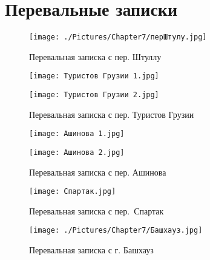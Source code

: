\graphicspath{ {./Pictures/Chapter7/} }

\section{Перевальные записки}\label{sec:notes}
    \begin{figure}[ht]\label{fig:pass_notes_shtulu}
        \centering
        \texttt{[image: ./Pictures/Chapter7/перШтулу.jpg]}
        \caption{Перевальная записка с пер. Штуллу}
    \end{figure}
    
    \begin{figure}[ht]\label{fig:pass_notes_turists_gergia}
        \begin{center}
            \begin{minipage}[h]{0.5\linewidth}
                \texttt{[image: Туристов Грузии 1.jpg]}
            \end{minipage}%
            \begin{minipage}[h]{0.5\linewidth}
                \texttt{[image: Туристов Грузии 2.jpg]}
            \end{minipage}
        \end{center}
        \caption{Перевальная записка с пер. Туристов Грузии}
    \end{figure}

    \begin{figure}[ht]\label{fig:pass_notes_ashinova}
        \begin{center}
            \begin{minipage}[h]{0.5\linewidth}
                \texttt{[image: Ашинова 1.jpg]}
            \end{minipage}%
            \begin{minipage}[h]{0.5\linewidth}
                \texttt{[image: Ашинова 2.jpg]}
            \end{minipage}
        \end{center}
        \caption{Перевальная записка с пер. Ашинова}
    \end{figure}

    \begin{figure}[ht]
        \begin{center}
            \begin{minipage}[h]{0.5\linewidth}\label{fig:pass_notes_spartak}
                \texttt{[image: Спартак.jpg]}
                \caption{Перевальная записка с пер.~Спартак}
            \end{minipage}%
            \begin{minipage}[h]{0.5\linewidth}\label{fig:pass_notes_bashhouse}
                \texttt{[image: ./Pictures/Chapter7/Башхауз.jpg]}
                \caption{Перевальная записка с г. Башхауз}
            \end{minipage}
        \end{center}
    \end{figure}

